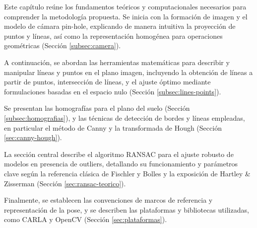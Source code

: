 Este capítulo reúne los fundamentos teóricos y computacionales necesarios para comprender la metodología propuesta. Se inicia con la formación de imagen y el modelo de cámara pin-hole, explicando de manera intuitiva la proyección de puntos y líneas, así como la representación homogénea para operaciones geométricas (Sección \ref{subsec:camera}).

A continuación, se abordan las herramientas matemáticas para describir y manipular líneas y puntos en el plano imagen, incluyendo la obtención de líneas a partir de puntos, intersección de líneas, y el ajuste óptimo mediante formulaciones basadas en el espacio nulo (Sección \ref{subsec:lines-points}).

Se presentan las homografías para el plano del suelo (Sección \ref{subsec:homografias}), y las técnicas de detección de bordes y líneas empleadas, en particular el método de Canny y la transformada de Hough (Sección \ref{sec:canny-hough}).

La sección central describe el algoritmo RANSAC para el ajuste robusto de modelos en presencia de outliers, detallando su funcionamiento y parámetros clave según la referencia clásica de Fischler y Bolles y la exposición de Hartley \& Zisserman (Sección \ref{sec:ransac-teorico}).

Finalmente, se establecen las convenciones de marcos de referencia y representación de la pose, y se describen las plataformas y bibliotecas utilizadas, como CARLA y OpenCV (Sección \ref{sec:plataformas}).
